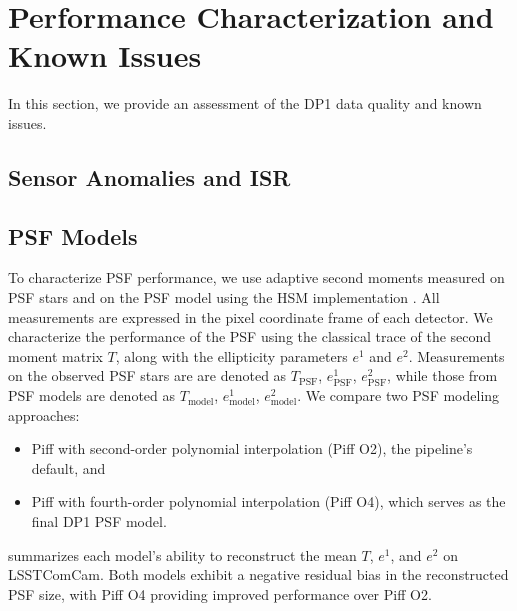 \section{Performance Characterization and Known Issues}
\label{sec:performance}
%
In this section, we provide an assessment of the \gls{DP1} data quality and known issues.
%

\subsection{Sensor Anomalies and ISR}
\label{ssec:sensor_anomalies}



\subsection{PSF Models}
\label{ssec:psf_models}
To characterize \gls{PSF}  performance, we use adaptive second moments \citep{2002AJ....123..583B} measured on \gls{PSF} stars and on the PSF model using the \gls{HSM} implementation \citep{2003MNRAS.343..459H, 2005MNRAS.361.1287M}.
All measurements are expressed in the pixel coordinate frame of each detector.
We characterize the performance of the PSF using the classical trace of the  second moment matrix $T$, along with the ellipticity parameters $e^1$ and $e^2$.
Measurements on the observed PSF stars are are denoted as  $T_{\text{PSF}}$, $e^1_{\text{PSF}}$,  $e^2_{\text{PSF}}$, while those from PSF models are denoted as  $T_{\text{model}}$, $e^1_{\text{model}}$, $e^2_{\text{model}}$.
We compare two PSF modeling approaches:
\begin{itemize}
\item Piff with second-order polynomial interpolation (Piff O2), the pipeline's default, and
\item Piff with fourth-order polynomial interpolation (Piff O4), which serves as the final DP1 PSF model.	
\end{itemize}
 summarizes each model’s ability to reconstruct the mean $T$, $e^1$, and $e^2$ on  \gls{LSSTComCam}. 
Both models exhibit a negative residual bias in the reconstructed PSF size, with Piff O4 providing improved performance over Piff O2.


